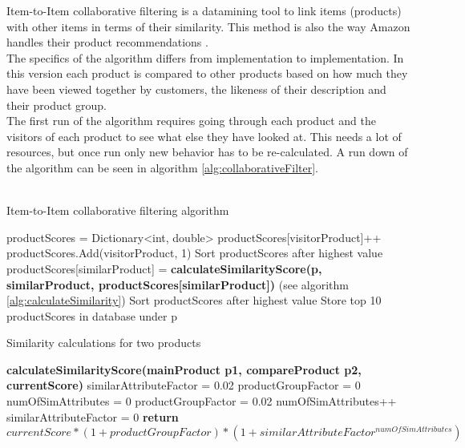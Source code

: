 Item-to-Item collaborative filtering is a datamining tool to link items (products) with other items in terms of their similarity. This method is also the way \gls{Amazon} handles their product recommendations \cite{AmazonRecommendations}. \\
The specifics of the algorithm differs from implementation to implementation. In this version each product is compared to other products based on how much they have been viewed together by customers, the likeness of their description and their product group. \\
The first run of the algorithm requires going through each product and the visitors of each product to see what else they have looked at. This needs a lot of resources, but once run only new behavior has to be re-calculated. A run down of the algorithm can be seen in algorithm \ref{alg:collaborativeFilter}. \\\\

\begin{algorithm}[H]
\caption{Item-to-Item collaborative filtering algorithm}
\label{alg:collaborativeFilter}
\begin{algorithmic}[!H]
\State productScores = Dictionary<int, double>
\State productScores[visitorProduct]++
\Else
\State productScores.Add(visitorProduct, 1)
\EndIf
\EndFor
\EndFor
\State Sort productScores after highest value
\State productScores[similarProduct] = \textbf{calculateSimilarityScore(p, similarProduct, productScores[similarProduct])} (see algorithm \ref{alg:calculateSimilarity})
\EndFor
\State Sort productScores after highest value
\State Store top 10 productScores in database under p
\EndFor
\end{algorithmic}
\end{algorithm}

\begin{algorithm}[H]
\caption{Similarity calculations for two products }
\label{alg:calculateSimilarity}
\begin{algorithmic}[!H]

\State \textbf{calculateSimilarityScore(mainProduct p1, compareProduct p2, currentScore)}
\State similarAttributeFactor = 0.02
\State productGroupFactor = 0
\State numOfSimAttributes = 0
\State productGroupFactor = 0.02
\EndIf
{}
\State numOfSimAttributes++
\EndIf
\EndFor
{}
\State similarAttributeFactor = 0
\EndIf
\State \textbf{return} \begin{math} currentScore * (1+productGroupFactor)*(1+similarAttributeFactor^{numOfSimAttributes}) \end{math}
\end{algorithmic}
\end{algorithm}


